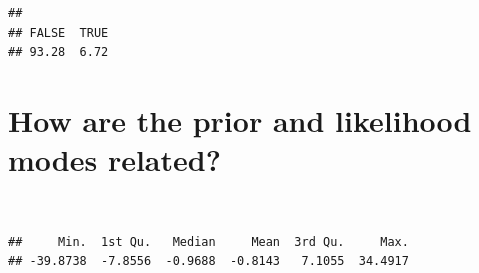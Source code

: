 \documentclass[12pt,a4paper]{article}
\newenvironment{Shaded}{\begin{snugshade}}{\end{snugshade}}
\newcommand{\KeywordTok}[1]{\textcolor[rgb]{0.13,0.29,0.53}{\textbf{#1}}}
\newcommand{\DataTypeTok}[1]{\textcolor[rgb]{0.13,0.29,0.53}{#1}}
\newcommand{\DecValTok}[1]{\textcolor[rgb]{0.00,0.00,0.81}{#1}}
\newcommand{\StringTok}[1]{\textcolor[rgb]{0.31,0.60,0.02}{#1}}
\newcommand{\OperatorTok}[1]{\textcolor[rgb]{0.81,0.36,0.00}{\textbf{#1}}}
\newcommand{\NormalTok}[1]{#1}
\begin{document}
\begin{verbatim}
## 
## FALSE  TRUE 
## 93.28  6.72
\end{verbatim}

\newpage

\hypertarget{how-are-the-prior-and-likelihood-modes-related}{%
\section{How are the prior and likelihood modes
related?}\label{how-are-the-prior-and-likelihood-modes-related}}

~

\begin{Shaded}
\end{Shaded}

\begin{verbatim}
##     Min.  1st Qu.   Median     Mean  3rd Qu.     Max. 
## -39.8738  -7.8556  -0.9688  -0.8143   7.1055  34.4917
\end{verbatim}

\begin{Shaded}
\end{Shaded}
\end{document}
